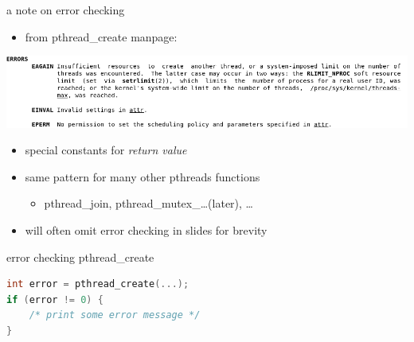 \begin{frame}{a note on error checking}
\begin{itemize}
\item from pthread\_create manpage:
\end{itemize}
\includegraphics[width=\textwidth]{../threads/pthread-create-errors}
\begin{itemize}
\item special constants for \textit{return value}
\vspace{.5cm}
\item same pattern for many other pthreads functions
    \begin{itemize}
    \item pthread\_join, pthread\_mutex\_\ldots (later), \ldots
    \end{itemize}
\item will often omit error checking in slides for brevity
\end{itemize}
\end{frame}

\begin{frame}[fragile,label=pthreadCreateErrorCheck]{error checking pthread\_create}
\begin{lstlisting}[language=C++,style=small]
int error = pthread_create(...);
if (error != 0) {
    /* print some error message */
}
\end{lstlisting}
\end{frame}
